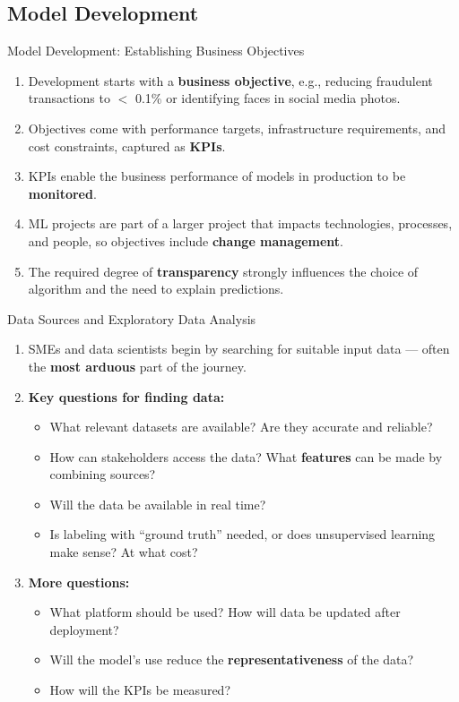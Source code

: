 \subsection{Model Development}

\begin{frame}{Model Development: Establishing Business Objectives}
\begin{enumerate}
\item<1-> Development starts with a \textbf{business objective}, e.g., reducing fraudulent transactions to $<$ 0.1\% or identifying faces in social media photos.
\item<2-> Objectives come with performance targets, infrastructure requirements, and cost constraints, captured as \textbf{KPIs}.
\item<3-> KPIs enable the business performance of models in production to be \textbf{monitored}.
\item<4-> ML projects are part of a larger project that impacts technologies, processes, and people, so objectives include \textbf{change management}.
\item<5-> The required degree of \textbf{transparency} strongly influences the choice of algorithm and the need to explain predictions.
\end{enumerate}
\end{frame}

\begin{frame}{Data Sources and Exploratory Data Analysis}
\small
\begin{enumerate}
\item<1-> SMEs and data scientists begin by searching for suitable input data --- often the \textbf{most arduous} part of the journey.
\item<2-> \textbf{Key questions for finding data:}
    \begin{itemize}
    \item What relevant datasets are available? Are they accurate and reliable?
    \item How can stakeholders access the data? What \textbf{features} can be made by combining sources?
    \item Will the data be available in real time?
    \item Is labeling with ``ground truth'' needed, or does unsupervised learning make sense? At what cost?
    \end{itemize}
\item<3-> \textbf{More questions:}
    \begin{itemize}
    \item What platform should be used? How will data be updated after deployment?
    \item Will the model's use reduce the \textbf{representativeness} of the data?
    \item How will the KPIs be measured?
    \end{itemize}
\end{enumerate}
\end{frame}

